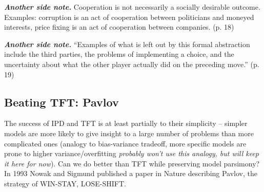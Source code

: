 \textit{\textbf{Another side note.}} Cooperation is not necessarily a socially desirable outcome. Examples: corruption is an act of cooperation between politicians and moneyed interests, price fixing is an act of cooperation between companies. (p. 18)

\textit{\textbf{Another side note.}} ``Examples of what is left out by this formal abstraction include the third parties, the problems of implementing a choice, and the uncertainty about what the other player actually did on the preceding move.'' (p. 19)

\subsection{Beating TFT: Pavlov}
The success of IPD and TFT is at least partially to their simplicity -- simpler models are more likely to give insight to a large number of problems than more complicated ones (analogy to bias-variance tradeoff, more specific models are prone to higher variance/overfitting \textit{probably won't use this analogy, but will keep it here for now}). Can we do better than TFT while preserving model parsimony? In 1993 Nowak and Sigmund published a paper in Nature describing Pavlov, the strategy of WIN-STAY, LOSE-SHIFT.
